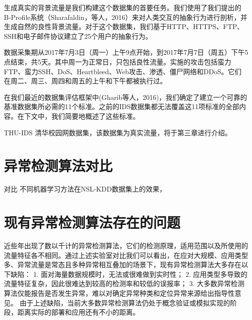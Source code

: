 生成真实的背景流量是我们构建这个数据集的首要任务。我们使用了我们提出的B-Profile系统（Sharafaldin，等人，2016）来对人类交互的抽象行为进行剖析，并生成自然的良性背景流量。对于这个数据集，我们基于HTTP、HTTPS、FTP、SSH和电子邮件协议建立了25个用户的抽象行为。

数据采集期从2017年7月3日（周一）上午9点开始，到2017年7月7日（周五）下午5点结束，共5天。其中周一为正常日，只包括良性流量。实施的攻击包括蛮力FTP、蛮力SSH、DoS、Heartbleed、Web攻击、渗透、僵尸网络和DDoS。它们在周二、周三、周四和周五的上午和下午都被执行过。

在我们最近的数据集评估框架中(Gharib等人，2016)，我们确定了建立一个可靠的基准数据集所必需的11个标准。之前的IDS数据集都无法覆盖这11项标准的全部内容。在下文中，我们简要地概述了这些标准。

THU-IDS 清华校园网数据集，该数据集为真实流量，将于第三章进行介绍。

\section{异常检测算法对比}
对比
不同机器学习方法在NSL-KDD数据集上的效果，
\section{现有异常检测算法存在的问题}
近些年出现了数以千计的异常检测算法，它们的检测原理，适用范围以及所使用的流量特征各不相同。通过上述实验室对比我们可以看出，在应对大规模、应用类型多、异常流量是常态且多种异常相互叠加的场景下，现有异常检测算法大多存在以下缺陷：
1.	面对海量数据规模时，无法或很难做到实时性；
2.	应用类型多导致的流量特征复杂，因此很难达到较高的检测率和较低的误报率；
3.	大多数异常检测算法仅能报告是否发生异常，难以对确定异常种类和定位异常来源给出指导性意见。
由于上述缺陷，当前大多数异常检测算法仍处于概念验证或模拟实现的阶段，距离实际的部署和应用还有不小的距离。
